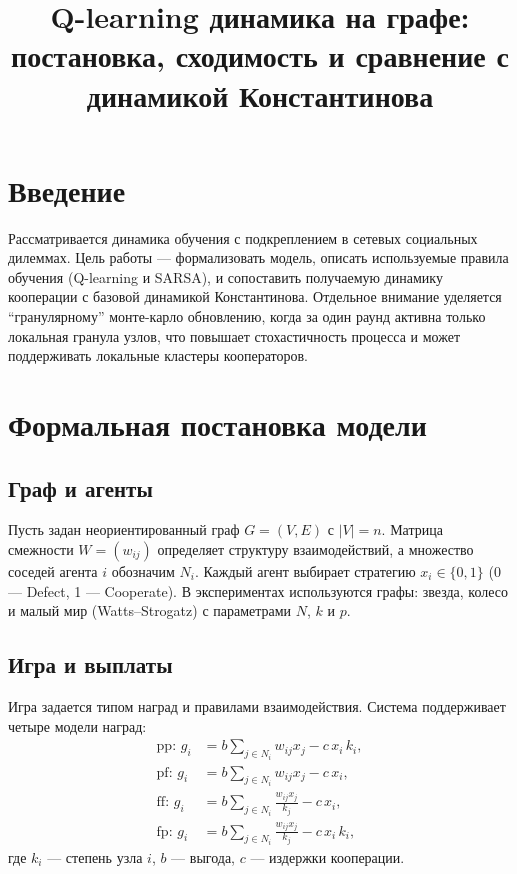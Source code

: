 \documentclass[a4paper, fontsize=14pt]{article}
\title{Q-learning динамика на графе: постановка, сходимость и сравнение с динамикой Константинова}
\author{}
\date{}
\begin{document}
\maketitle

\section{Введение}
Рассматривается динамика обучения с подкреплением в сетевых социальных дилеммах.
Цель работы --- формализовать модель, описать используемые правила обучения
(Q-learning и SARSA), и сопоставить получаемую динамику кооперации с базовой
динамикой Константинова. Отдельное внимание уделяется ``гранулярному''
монте-карло обновлению, когда за один раунд активна только локальная гранула
узлов, что повышает стохастичность процесса и может поддерживать локальные
кластеры кооператоров.

\section{Формальная постановка модели}
\subsection{Граф и агенты}
Пусть задан неориентированный граф $G=(V,E)$ с $|V|=n$.
Матрица смежности $W=(w_{ij})$ определяет структуру взаимодействий,
а множество соседей агента $i$ обозначим $N_i$.
Каждый агент выбирает стратегию $x_i \in \{0,1\}$
(0 --- Defect, 1 --- Cooperate).
В экспериментах используются графы: звезда, колесо и малый мир
(Watts--Strogatz) с параметрами $N$, $k$ и $p$.

\subsection{Игра и выплаты}
Игра задается типом наград и правилами взаимодействия.
Система поддерживает четыре модели наград:
\begin{align}
\text{pp: } g_i &= b \sum_{j \in N_i} w_{ij} x_j - c \, x_i \, k_i, \\
\text{pf: } g_i &= b \sum_{j \in N_i} w_{ij} x_j - c \, x_i, \\
\text{ff: } g_i &= b \sum_{j \in N_i} \frac{w_{ij} x_j}{k_j} - c \, x_i, \\
\text{fp: } g_i &= b \sum_{j \in N_i} \frac{w_{ij} x_j}{k_j} - c \, x_i \, k_i,
\end{align}
где $k_i$ --- степень узла $i$, $b$ --- выгода, $c$ --- издержки кооперации.
\end{document}
